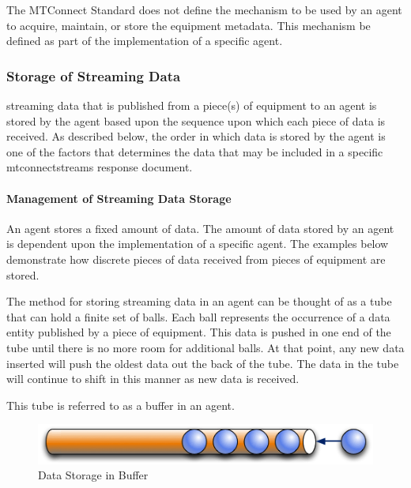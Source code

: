 The MTConnect Standard does not define the mechanism to be used by an \gls{agent} to acquire, maintain, or store the \gls{equipment metadata}.  This mechanism \MUST be defined as part of the implementation of a specific \gls{agent}.

\subsubsection{Storage of Streaming Data}

\gls{streaming data} that is published from a piece(s) of equipment to an \gls{agent} is stored by the \gls{agent} based upon the sequence upon which each piece of data is received.  As described below, the order in which data is stored by the \gls{agent} is one of the factors that determines the data that may be included in a specific \gls{mtconnectstreams response document}. 

\paragraph{Management of Streaming Data Storage}\mbox{}
\label{sec:Management of Streaming Data Storage}

An \gls{agent} stores a fixed amount of data.  The amount of data stored by an \gls{agent} is dependent upon the implementation of a specific \gls{agent}.  The examples below demonstrate how discrete pieces of data received from pieces of equipment are stored.

The method for storing \gls{streaming data} in an \gls{agent} can be thought of as a tube that can hold a finite set of balls.  Each ball represents the occurrence of a \gls{data entity} published by a piece of equipment.  This data is pushed in one end of the tube until there is no more room for additional balls.  At that point, any new data inserted will push the oldest data out the back of the tube.  The data in the tube will continue to shift in this manner as new data is received.

This tube is referred to as a \gls{buffer} in an \gls{agent}.

\begin{figure}[ht]
  \centering
  \includegraphics[width=1.0\textwidth]{figures/data-storage-in-buffer.png}
  \caption{Data Storage in Buffer}
  \label{fig:data-storage-in-buffer}
\end{figure}

